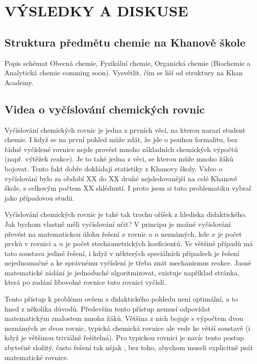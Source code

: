 \documentclass[a4paper, 12pt]{article}
\begin{document}
\newpage
\section{VÝSLEDKY A DISKUSE}

\subsection{Struktura předmětu chemie na Khanově škole}
Popis schémat Obecná chemie, Fyzikální chemie, Organická chemie (Biochemie a Analytická chemie comming soon).
Vysvětlit, čím se liší od struktury na Khan Academy.

\subsection{Videa o vyčíslování chemických rovnic}
Vyčíslování chemických rovnic je jedna z prvních věcí, na kterou narazí student chemie. I když se na první pohled může zdát, že jde o pouhou formalitu, bez řádně vyčíslené rovnice nejde provést mnoho základních chemických výpočtů (např. výtěžek reakce). Je to také jedna z věci, se kterou může mnoho žáků bojovat. Tento fakt dobře dokládají statistiky z Khanovy školy. Video o vyčíslování bylo za období XX do XX druhé nejsledovanější na celé Khanově škole, s celkovým počtem XX shlédnutí. I proto jsem si tuto problematiku vybral jako případovou studii. 

Vyčíslování chemických rovnic je také tak trochu oříšek z hlediska didaktického. Jak bychom vlastně měli vyčíslování učit?
V principu je možné vyčíslování převést na matematickou úlohu řešení $x$ rovnic o $n$ neznámých, kde $x$ je počet prvků v rovnici a $n$ je počet stechiometrických koeficientů.\cite{marecek} Ve většině případů má tato soustava jediné řešení, i když v některých speciálních případech je řešení nejednoznačné a ke správnému vyčíslení je třeba znát mechanismus reakce. Jasné matematické zádání je jednoduché algoritmizovat, existuje například stránka, která po zadání libovolné rovnice tuto rovnici vyčíslí.\cite{}

Tento přístup k problému ovšem z didaktického pohledu není optimální, a to hned z několika důvodů.
Především tento přístup nemusí odpovídat matematickým znalostem mnoha žáků. Většina z nich bojuje s výpočtem dvou neznámých ze dvou rovnic, typická chemická rovnice ale vede ke větší soustavě (i když je většinou triviálně řešitelná). 
Pro typickou rovnici je navíc tento postup zbytečně složitý, často řešení tak nějak , bez toho, abychom museli explicitně psát matematické rovnice. 
\end{document}
